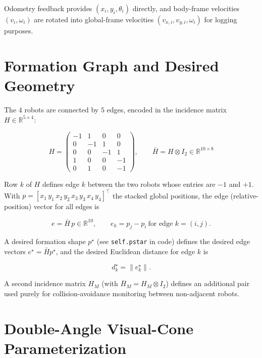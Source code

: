 \documentclass[11pt]{article}
\begin{document}
Odometry feedback provides $(x_i, y_i, \theta_i)$ directly, and body-frame
velocities $(v_i, \omega_i)$ are rotated into global-frame velocities
$(v_{x,i}, v_{y,i}, \omega_i)$ for logging purposes.

\section{Formation Graph and Desired Geometry}

The $4$ robots are connected by $5$ edges, encoded in the incidence matrix
$H \in \mathbb{R}^{5 \times 4}$:

\begin{equation}
    H =
    \begin{pmatrix}
        -1 & 1 & 0 & 0 \\
        0 & -1 & 1 & 0 \\
        0 & 0 & -1 & 1 \\
        1 & 0 & 0 & -1 \\
        0 & 1 & 0 & -1
    \end{pmatrix},
    \qquad
    \bar{H} = H \otimes I_2 \in \mathbb{R}^{10 \times 8}
\end{equation}

Row $k$ of $H$ defines edge $k$ between the two robots whose entries are
$-1$ and $+1$. With $p = [x_1\,y_1\,x_2\,y_2\,x_3\,y_3\,x_4\,y_4]^\top$ the
stacked global positions, the edge (relative-position) vector for all edges is

\begin{equation}
    e = \bar{H}\, p \in \mathbb{R}^{10}, \qquad
    e_k = p_j - p_i \ \text{for edge } k = (i,j).
\end{equation}

A desired formation shape $p^\star$ (see \texttt{self.pstar} in code) defines
the desired edge vectors $e^\star = \bar{H} p^\star$, and the desired
Euclidean distance for edge $k$ is

\begin{equation}
    d_k^\star = \lVert e_k^\star \rVert.
\end{equation}

A second incidence matrix $H_M$ (with $\bar{H}_M = H_M \otimes I_2$) defines
an additional pair used purely for collision-avoidance monitoring between
non-adjacent robots.

\section{Double-Angle Visual-Cone Parameterization}
\end{document}
